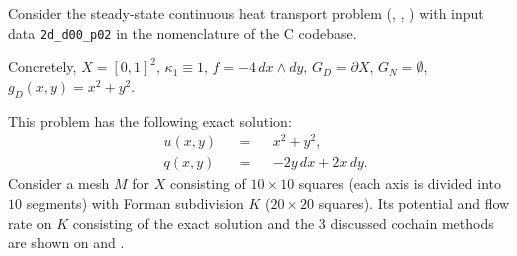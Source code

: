\begin{example}
  \label{idec/diffusion/continuous/steady_state/examples/2d_d00_p02-example}
  Consider the steady-state continuous heat transport problem
  (,
   ,
   )
  with input data \verb|2d_d00_p02| in the nomenclature of the C codebase.

  Concretely,
    $X = [0, 1]^2$,
    $\kappa_1 \equiv 1$,
    $f = -4 \, d x \wedge d y$,
    $G_D = \partial X$,
    $G_N = \emptyset$,
    $g_D(x, y) = x^2 + y^2$.

  This problem has the following exact solution:
  \begin{subequations}
    \begin{alignat}{3}
      & u(x, y) && = && x^2 + y^2, \\
      & q(x, y) && = && - 2 y\, d x + 2 x\, d y.
    \end{alignat}
  \end{subequations}
  Consider a mesh $M$ for $X$ consisting of $10 \times 10$ squares (each axis is
  divided into $10$ segments) with Forman subdivision $K$ ($20 \times 20$
  squares).
  Its potential and flow rate on $K$ consisting of the exact solution and the
  $3$ discussed cochain methods are shown on
  and
  .
\end{example}
